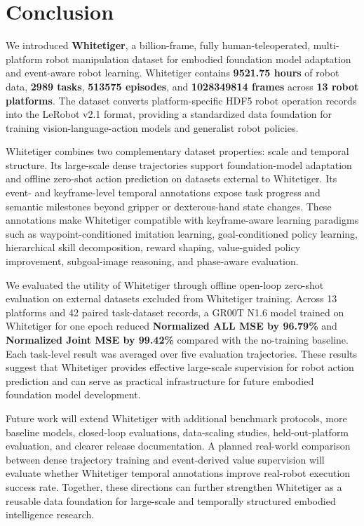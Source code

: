 \section{Conclusion}

We introduced \textbf{Whitetiger}, a billion-frame, fully human-teleoperated, multi-platform robot manipulation dataset for embodied foundation model adaptation and event-aware robot learning. Whitetiger contains \textbf{9521.75 hours} of robot data, \textbf{2989 tasks}, \textbf{513575 episodes}, and \textbf{1028349814 frames} across \textbf{13 robot platforms}. The dataset converts platform-specific HDF5 robot operation records into the LeRobot v2.1 format, providing a standardized data foundation for training vision-language-action models and generalist robot policies.

Whitetiger combines two complementary dataset properties: scale and temporal structure. Its large-scale dense trajectories support foundation-model adaptation and offline zero-shot action prediction on datasets external to Whitetiger. Its event- and keyframe-level temporal annotations expose task progress and semantic milestones beyond gripper or dexterous-hand state changes. These annotations make Whitetiger compatible with keyframe-aware learning paradigms such as waypoint-conditioned imitation learning, goal-conditioned policy learning, hierarchical skill decomposition, reward shaping, value-guided policy improvement, subgoal-image reasoning, and phase-aware evaluation.

We evaluated the utility of Whitetiger through offline open-loop zero-shot evaluation on external datasets excluded from Whitetiger training. Across 13 platforms and 42 paired task-dataset records, a GR00T N1.6 model trained on Whitetiger for one epoch reduced \textbf{Normalized ALL MSE by 96.79\%} and \textbf{Normalized Joint MSE by 99.42\%} compared with the no-training baseline. Each task-level result was averaged over five evaluation trajectories. These results suggest that Whitetiger provides effective large-scale supervision for robot action prediction and can serve as practical infrastructure for future embodied foundation model development.

Future work will extend Whitetiger with additional benchmark protocols, more baseline models, closed-loop evaluations, data-scaling studies, held-out-platform evaluation, and clearer release documentation. A planned real-world comparison between dense trajectory training and event-derived value supervision will evaluate whether Whitetiger temporal annotations improve real-robot execution success rate. Together, these directions can further strengthen Whitetiger as a reusable data foundation for large-scale and temporally structured embodied intelligence research.
